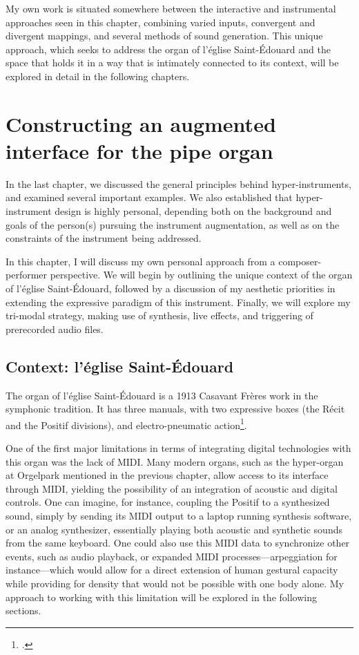 \documentclass[12pt,twoside,maitrise]{dms_ks}
\theoremstyle{definition}
\begin{document}
{My own work is situated somewhere between the interactive and instrumental approaches seen in this chapter, combining varied inputs, convergent and divergent mappings, and several methods of sound generation.
This unique approach, which seeks to address the organ of l'église Saint-Édouard and the space that holds it in a way that is intimately connected to its context, will be explored in detail in the following chapters. 

\chapter{Constructing an augmented interface for the pipe organ}

In the last chapter, we discussed the general principles behind hyper-instruments, and examined several important examples. 
We also established that hyper-instrument design is highly personal, depending both on the background and goals of the person(s) pursuing the instrument augmentation, as well as on the constraints of the instrument being addressed. 

In this chapter, I will discuss my own personal approach from a composer-performer perspective. We will begin by outlining the unique context of the organ of l'église Saint-Édouard, followed by a discussion of my aesthetic priorities in extending the expressive paradigm of this instrument. Finally, we will explore my tri-modal strategy, making use of synthesis, live effects, and triggering of prerecorded audio files. 

\section{Context: l'église Saint-Édouard}

The organ of l'église Saint-Édouard is a 1913 Casavant Frères work in the symphonic tradition. 
It has three manuals, with two expressive boxes (the Récit and the Positif divisions), and electro-pneumatic action\footcite{noauthor_eglise_nodate}. 

One of the first major limitations in terms of integrating digital technologies with this organ was the lack of MIDI. 
Many modern organs, such as the hyper-organ at Orgelpark mentioned in the previous chapter, allow access to its interface through MIDI, yielding the possibility of an integration of acoustic and digital controls. 
One can imagine, for instance, coupling the Positif to a synthesized sound, simply by sending its MIDI output to a laptop running synthesis software, or an analog synthesizer, essentially playing both acoustic and synthetic sounds from the same keyboard. 
One could also use this MIDI data to synchronize other events, such as audio playback, or expanded MIDI processes---arpeggiation for instance---which would allow for a direct extension of human gestural capacity while providing for density that would not be possible with one body alone.
My approach to working with this limitation will be explored in the following sections.

}
\end{document}
